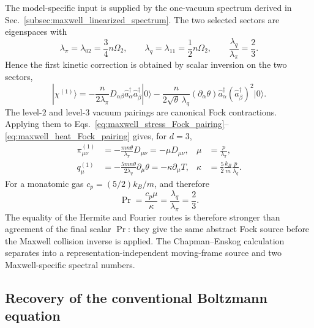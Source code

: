 \documentclass[11pt,oneside]{article}
\numberwithin{equation}{section}
\theoremstyle{definition}
\begin{document}
The model-specific input is supplied by the one-vacuum spectrum derived in Sec.~\ref{subsec:maxwell_linearized_spectrum}.  The two selected sectors are eigenspaces with
\begin{equation}
\lambda_\pi=\lambda_{02}=\frac34n\Omega_2,
\qquad
\lambda_q=\lambda_{11}=\frac12n\Omega_2,
\qquad
\frac{\lambda_q}{\lambda_\pi}=\frac23.
\label{eq:maxwell_hydro_rates_compact}
\end{equation}
Hence the first kinetic correction is obtained by scalar inversion on the two sectors,
\begin{equation}
|\chi^{(1)}\rangle
=-\frac{n}{2\lambda_\pi}
D_{\alpha\beta}\hat a_\alpha^\dagger\hat a_\beta^\dagger|0\rangle
-\frac{n}{2\sqrt\theta\,\lambda_q}
(\partial_\alpha\theta)
\hat a_\alpha^\dagger(\hat a_\beta^\dagger)^2|0\rangle.
\label{eq:maxwell_chi1_compact}
\end{equation}
The level-$2$ and level-$3$ vacuum pairings are canonical Fock contractions.  Applying them to Eqs.~\eqref{eq:maxwell_stress_Fock_pairing}--\eqref{eq:maxwell_heat_Fock_pairing} gives, for $d=3$,
\begin{align}
\pi_{\mu\nu}^{(1)}
&=-\frac{mn\theta}{\lambda_\pi}D_{\mu\nu}
=-\mu D_{\mu\nu},
&
\mu&=\frac{p}{\lambda_\pi},
\label{eq:maxwell_viscosity}
\\
q_\mu^{(1)}
&=-\frac{5mn\theta}{2\lambda_q}\partial_\mu\theta
=-\kappa\partial_\mu T,
&
\kappa&=\frac52\frac{k_B}{m}\frac{p}{\lambda_q}.
\label{eq:maxwell_kappa}
\end{align}
For a monatomic gas $c_p=(5/2)k_B/m$, and therefore
\begin{equation}
\boxed{
\Pr
=\frac{c_p\mu}{\kappa}
=\frac{\lambda_q}{\lambda_\pi}
=\frac23.
}
\label{eq:maxwell_prandtl_exact}
\end{equation}
The equality of the Hermite and Fourier routes is therefore stronger than agreement of the final scalar $\Pr$: they give the same abstract Fock source before the Maxwell collision inverse is applied.  The Chapman--Enskog calculation separates into a representation-independent moving-frame source and two Maxwell-specific spectral numbers.

\subsection{Recovery of the conventional Boltzmann equation}
\label{subsec:maxwell_recovery_velocity}
\end{document}
